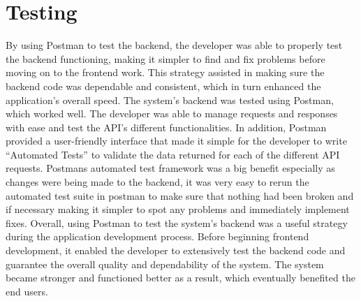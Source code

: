 \section{Testing}
By using Postman to test the backend, the developer was able to properly test the backend functioning, making it simpler to find and fix problems before moving on to the frontend work. This strategy assisted in making sure the backend code was dependable and consistent, which in turn enhanced the application's overall speed.
\newline \newline
The system's backend was tested using Postman, which worked well. The developer was able to manage requests and responses with ease and test the API's different functionalities. In addition, Postman provided a user-friendly interface that made it simple for the developer to write “Automated Tests” to validate the data returned for each of the different API requests. Postmans automated test framework was a big benefit especially as changes were being made to the backend, it was very easy to rerun the automated test suite in postman to make sure that nothing had been broken and if necessary making it simpler to spot any problems and immediately implement fixes.
\newline \newline
Overall, using Postman to test the system's backend was a useful strategy during the application development process. Before beginning frontend development, it enabled the developer to extensively test the backend code and guarantee the overall quality and dependability of the system. The system became stronger and functioned better as a result, which eventually benefited the end users.
\newline \newline


